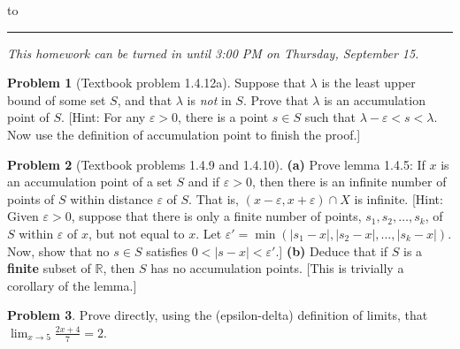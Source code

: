 \documentclass[12pt]{article}
\newcommand{\eps}{\varepsilon}
\newcommand{\R}{{\mathbb R}}
\theoremstyle{definition}
\newtheorem{problem}{Problem}
\newenvironment{answer}{\par\bigskip\bgroup\color{darkblue}}{\egroup}
\begin{document}
\hbox to 
\nointerlineskip
\vskip 2pt
\hrule height 1pt

\medskip

\centerline{\textit{This homework can be turned in until 3:00 PM on Thursday, September 15.}}

\bigskip

\def\ds{\displaystyle}


\begin{problem}[Textbook problem 1.4.12a]
Suppose that $\lambda$ is the least upper bound of some set $S$, and that
$\lambda$ is \textit{not} in $S$.  Prove that $\lambda$ is an accumulation
point of $S$.  [Hint:  For any $\eps>0$, there is a point $s\in S$ such 
that $\lambda-\eps < s < \lambda$.  Now use the definition of accumulation
point to finish the proof.]
\end{problem}

\begin{answer}
\end{answer}



\begin{problem}
[Textbook problems 1.4.9 and 1.4.10]
\textbf{(a)} Prove lemma 1.4.5: If $x$ is an accumulation point of a set $S$ and if $\eps>0$,
then there is an infinite number of points of $S$ within distance $\eps$ of $S$.
That is, $(x-\eps,x+\eps)\cap X$ is infinite.
[Hint: Given $\eps>0$, suppose that there is only a finite number of points,
$s_1,s_2,\dots,s_k$, of $S$ within $\eps$ of $x$, but not equal to $x$.  
Let $\eps'=\min(|s_1-x|,|s_2-x|,\dots,|s_k-x|)$.  Now, show that no $s\in S$
satisfies $0<|s-x|<\eps'$.]
\textbf{(b)} Deduce that if $S$ is a \textbf{finite} subset of $\R$, then
$S$ has no accumulation points.  [This is trivially a corollary of the lemma.]
\end{problem}

\begin{answer}
\end{answer}



\begin{problem}
Prove directly, using the (epsilon-delta) definition of limits, that ${\ds\lim_{x\to 5}}\frac{2x+4}{7}=2$.
\end{problem}

\begin{answer}
\end{answer}
\end{document}
